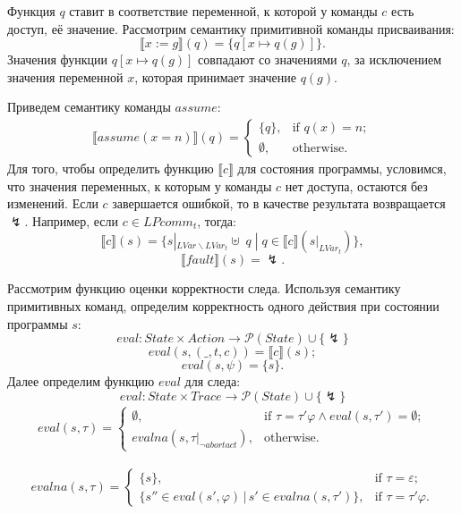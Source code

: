 Функция $q$ ставит в соответствие переменной, к которой у команды $c$ есть доступ, её значение. Рассмотрим семантику примитивной команды присваивания:
$$\llbracket x:=g \rrbracket(q) = \{ q[x \mapsto q(g) ] \}.$$ Значения функции $q[x \mapsto q(g) ]$ совпадают со значениями $q$, за исключением значения переменной $x$, которая принимает значение $q(g)$.

Приведем семантику команды $assume$:
\begin{align*}
  \llbracket assume(x=n)\rrbracket(q)=\begin{cases}
    \{q\}, & \text{if $q(x)=n$};\\
    \emptyset, & \text{otherwise}.
  \end{cases}
\end{align*}
Для того, чтобы определить функцию $\llbracket c \rrbracket$ для состояния программы, условимся, что значения переменных, к которым у команды $c$ нет доступа, остаются без изменений. Если $c$ завершается ошибкой, то в качестве результата возвращается $\lightning$. Например, если $c \in LPcomm_t$, тогда: $$\llbracket c \rrbracket (s) = \{s |_{LVar\backslash LVar_t} \uplus \; q  \;| \; q \in \llbracket c \rrbracket (s |_{LVar_t}) \},$$ $$\llbracket fault \rrbracket (s) = \lightning.$$

Рассмотрим функцию оценки корректности следа. Используя семантику примитивных команд, определим корректность одного действия при состоянии программы $s$:
$$eval: State \times Action \to \mathcal{P}(State) \cup \{ \lightning\} $$
$$eval(s,(\_,t,c)) = \llbracket c\rrbracket (s);$$
$$eval(s,\psi) = \{s\}.$$
Далее определим функцию $eval$ для следа:
$$eval: State \times Trace \to \mathcal{P}(State) \cup \{ \lightning\} $$
\begin{align*}
  eval(s,\tau)=\begin{cases}
    \emptyset, & \text{if $\tau = \tau'\varphi \land eval(s, \tau') = \emptyset$};\\
    evalna(s, \tau |_{\neg abortact}), & \text{otherwise}.
  \end{cases}
\end{align*}

\begin{align*}
     evalna(s,\tau)=\begin{cases}
    \{s\}, & \text{if $\tau =  \varepsilon$};\\ 
     \{s'' \in eval(s', \varphi) \, | \, s' \in  evalna(s, \tau') \}, & \text{if $\tau = \tau'\varphi$}.
   \end{cases}
  \end{align*}

